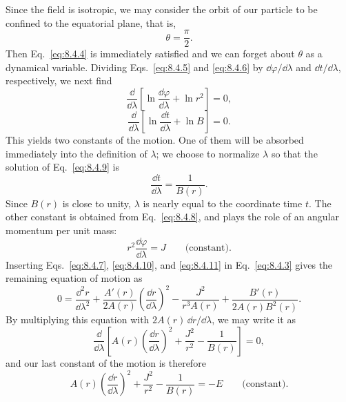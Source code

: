 Since the field is isotropic, we may consider the orbit of our particle to
be confined to the equatorial plane, that is,
\begin{equation}
  \theta=\frac{\pi}{2}.
  \tag{8.4.7}\label{eq:8.4.7}
\end{equation}
Then Eq.~\eqref{eq:8.4.4} is immediately satisfied and we can forget about
\(\theta\) as a dynamical variable. Dividing Eqs.~\eqref{eq:8.4.5} and
\eqref{eq:8.4.6} by \(\dd\varphi/\dd\lambda\) and \(\dd t/\dd\lambda\),
respectively, we next find
\begin{equation}
  \frac{\dd}{\dd\lambda}
  \left[
    \ln\frac{\dd\varphi}{\dd\lambda}+\ln r^2
  \right]=0,
  \tag{8.4.8}\label{eq:8.4.8}
\end{equation}
\begin{equation}
  \frac{\dd}{\dd\lambda}
  \left[
    \ln\frac{\dd t}{\dd\lambda}+\ln B
  \right]=0.
  \tag{8.4.9}\label{eq:8.4.9}
\end{equation}
This yields two constants of the motion. One of them will be absorbed
immediately into the definition of \(\lambda\); we choose to normalize
\(\lambda\) so that the solution of Eq.~\eqref{eq:8.4.9} is
\begin{equation}
  \frac{\dd t}{\dd\lambda}=\frac{1}{B(r)}.
  \tag{8.4.10}\label{eq:8.4.10}
\end{equation}
Since \(B(r)\) is close to unity, \(\lambda\) is nearly equal to the
coordinate time \(t\). The other constant is obtained from
Eq.~\eqref{eq:8.4.8}, and plays the role of an angular momentum per unit
mass:
\begin{equation}
  r^2\frac{\dd\varphi}{\dd\lambda}=J
  \qquad\text{(constant)}.
  \tag{8.4.11}\label{eq:8.4.11}
\end{equation}
Inserting Eqs.~\eqref{eq:8.4.7}, \eqref{eq:8.4.10}, and
\eqref{eq:8.4.11} in Eq.~\eqref{eq:8.4.3} gives the remaining equation
of motion as
\begin{equation}
  0
  =
  \frac{\dd^2r}{\dd\lambda^2}
  +\frac{A'(r)}{2A(r)}
    \left(\frac{\dd r}{\dd\lambda}\right)^2
  -\frac{J^2}{r^3A(r)}
  +\frac{B'(r)}{2A(r)B^2(r)}.
  \tag{8.4.12}\label{eq:8.4.12}
\end{equation}
By multiplying this equation with \(2A(r)\,\dd r/\dd\lambda\), we may write it
as
\[
  \frac{\dd}{\dd\lambda}
  \left[
    A(r)\left(\frac{\dd r}{\dd\lambda}\right)^2
    +\frac{J^2}{r^2}-\frac{1}{B(r)}
  \right]=0,
\]
and our last constant of the motion is therefore
\begin{equation}
  A(r)\left(\frac{\dd r}{\dd\lambda}\right)^2
  +\frac{J^2}{r^2}-\frac{1}{B(r)}
  =-E
  \qquad\text{(constant)}.
  \tag{8.4.13}\label{eq:8.4.13}
\end{equation}

